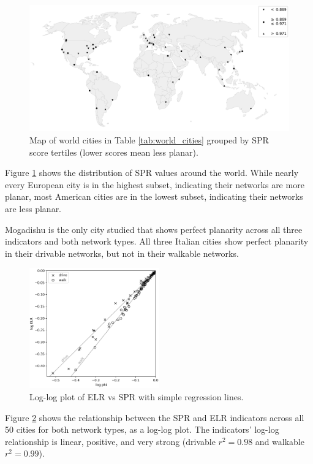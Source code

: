 \documentclass[Afour,sageh,times]{sagej}
\begin{document}
\begin{figure}[htbp]
	\center
	\includegraphics[width=\textwidth]{world_map_phi_bw.png}
	\caption{Map of world cities in Table \ref{tab:world_cities} grouped by SPR score tertiles (lower scores mean less planar).}
	\label{fig:world_map_bw}
\end{figure}

Figure \ref{fig:world_map_bw} shows the distribution of SPR values around the world. While nearly every European city is in the highest subset, indicating their networks are more planar, most American cities are in the lowest subset, indicating their networks are less planar.

Mogadishu is the only city studied that shows perfect planarity across all three indicators and both network types. All three Italian cities show perfect planarity in their drivable networks, but not in their walkable networks.

\begin{figure}[htbp]
	\includegraphics[width=0.5\textwidth]{regression_phi_split.png}
	\caption{Log-log plot of ELR vs SPR with simple regression lines.}
	\label{fig:regression_split}
\end{figure}

Figure \ref{fig:regression_split} shows the relationship between the SPR and ELR indicators across all 50 cities for both network types, as a log-log plot. The indicators' log-log relationship is linear, positive, and very strong (drivable $r^2=0.98$ and walkable $r^2=0.99$).
\end{document}
